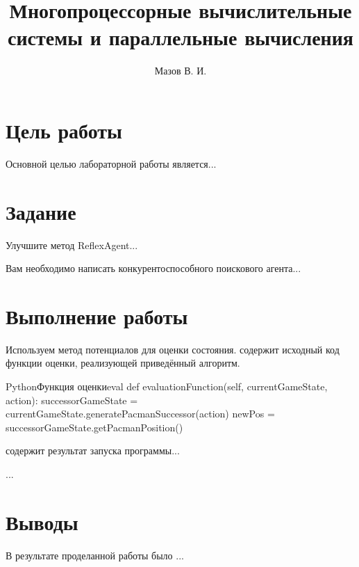 \documentclass{lab_report}
\begin{document}
\title{Многопроцессорные вычислительные системы и параллельные вычисления}
\author{Мазов В. И.}

\maketitle

\tableofcontents

\section{Цель работы}
Основной целью лабораторной работы является...


\section{Задание}
\begin{task}
	Улучшите метод ReflexAgent...
\end{task}

\begin{task}
	Вам необходимо написать конкурентоспособного поискового агента...
\end{task}

\section{Выполнение работы}

\taskDoneSection
Используем метод потенциалов для оценки состояния.  содержит исходный код функции оценки, реализующей приведённый алгоритм.

\begin{listing}{Python}{Функция оценки}{eval}
def evaluationFunction(self, currentGameState, action): 
	successorGameState = currentGameState.generatePacmanSuccessor(action)
	newPos = successorGameState.getPacmanPosition()
\end{listing}

 содержит результат запуска программы...


\taskDoneSection
...

\section{Выводы}
В результате проделанной работы было ...
\end{document}
